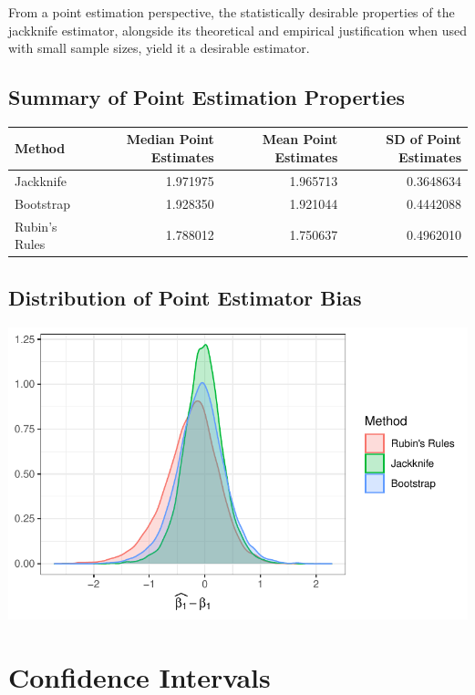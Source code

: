 \documentclass[
  letterpaper,
  DIV=11,
  numbers=noendperiod]{scrreprt}
\begin{document}
From a point estimation perspective, the statistically desirable
properties of the jackknife estimator, alongside its theoretical and
empirical justification when used with small sample sizes, yield it a
desirable estimator.

\hypertarget{sec-point}{%
\subsection{Summary of Point Estimation Properties}\label{sec-point}}

\begin{tabular}{lrrr}
\toprule
Method & Median Point Estimates  & Mean Point Estimates & SD of Point Estimates\\
\midrule
Jackknife & 1.971975 & 1.965713 & 0.3648634\\
Bootstrap & 1.928350 & 1.921044 & 0.4442088\\
Rubin's Rules & 1.788012 & 1.750637 & 0.4962010\\
\bottomrule
\end{tabular}

\hypertarget{sec-dist}{%
\subsection{Distribution of Point Estimator Bias}\label{sec-dist}}

\includegraphics{./results_files/figure-pdf/unnamed-chunk-3-1.pdf}

\hypertarget{sec-ci}{%
\section{Confidence Intervals}\label{sec-ci}}
\end{document}
